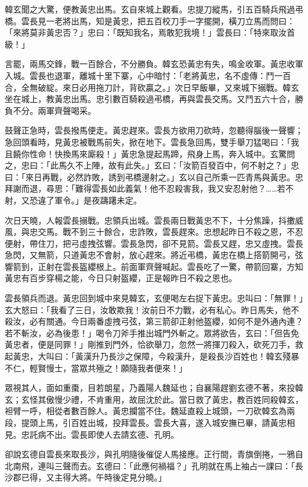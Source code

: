 韓玄聞之大驚，便教黃忠出馬。玄自來城上觀看。忠提刀縱馬，引五百騎兵飛過弔橋。雲長見一老將出馬，知是黃忠，把五百校刀手一字擺開，橫刀立馬而問曰：「來將莫非黃忠否？」忠曰：「既知我名，焉敢犯我境！」雲長曰：「特來取汝首級！」

言罷，兩馬交鋒，戰一百餘合，不分勝負。韓玄恐黃忠有失，鳴金收軍。黃忠收軍入城。雲長也退軍，離城十里下寨，心中暗忖：「老將黃忠，名不虛傳：鬥一百合，全無破綻。來日必用拖刀計，背砍贏之。」次日早飯畢，又來城下搦戰。韓玄坐在城上，教黃忠出馬。忠引數百騎殺過弔橋，再與雲長交馬。又鬥五六十合，勝負不分。兩軍齊聲喝采。

鼓聲正急時，雲長撥馬便走。黃忠趕來。雲長方欲用刀砍時，忽聽得腦後一聲響；急回頭看時，見黃忠被戰馬前失，掀在地下。雲長急回馬，雙手舉刀猛喝曰：「我且饒你性命！快換馬來廝殺！」黃忠急提起馬蹄，飛身上馬，奔入城中。玄驚問之，忠曰：「此馬久不上陣，故有此失。」玄曰：「汝箭百發百中，何不射之？」忠曰：「來日再戰，必然詐敗，誘到弔橋邊射之。」玄以自己所乘一匹青馬與黃忠。忠拜謝而退，尋思：「難得雲長如此義氣！他不忍殺害我，我又安忍射他？……若不射，又恐違了軍令。」是夜躊躇未定。

次日天曉，人報雲長搦戰。忠領兵出城。雲長兩日戰黃忠不下，十分焦躁，抖擻威風，與忠交馬。戰不到三十餘合，忠詐敗，雲長趕來。忠想起昨日不殺之恩，不忍便射，帶住刀，把弓虛拽弦響。雲長急閃，卻不見箭。雲長又趕，忠又虛拽。雲長急閃，又無箭，只道黃忠不會射，放心趕來。將近弔橋，黃忠在橋上搭箭開弓，弦響箭到，正射在雲長盔纓根上。前面軍齊聲喊起。雲長吃了一驚，帶箭回寨，方知黃忠有百步穿楊之能，今日只射盔纓，正是報昨日不殺之恩也。

雲長領兵而退。黃忠回到城中來見韓玄，玄便喝左右捉下黃忠。忠叫曰：「無罪！」玄大怒曰：「我看了三日，汝敢欺我！汝前日不力戰，必有私心。昨日馬失，他不殺汝，必有關通。今日兩番虛拽弓弦，第三箭卻正射他盔纓，如何不是外通內連？若不斬汝，必為後患！」喝令刀斧手推出城門外斬之。眾將欲告，玄曰：「但告免黃忠者，便是同罪！」剛推到門外，恰欲舉刀，忽然一將揮刀殺入，砍死刀手，救起黃忠，大叫曰：「黃漢升乃長沙之保障，今殺漢升，是殺長沙百姓也！韓玄殘暴不仁，輕賢慢士，當眾共殛之！願隨我者便來！」

眾視其人，面如重棗，目若朗星，乃義陽人魏延也；自襄陽趕劉玄德不著，來投韓玄；玄怪其傲慢少禮，不肯重用，故屈沈於此。當日救了黃忠，教百姓同殺韓玄，袒臂一呼，相從者數百餘人。黃忠攔當不住。魏延直殺上城頭，一刀砍韓玄為兩段，提頭上馬，引百姓出城，投拜雲長。雲長大喜，遂入城安撫已畢，請黃忠相見。忠託病不出。雲長即使人去請玄德、孔明。

卻說玄德自雲長來取長沙，與孔明隨後催促人馬接應。正行間，青旗倒捲，一鴉自北南飛，連叫三聲而去。玄德曰：「此應何禍福？」孔明就在馬上袖占一課曰：「長沙郡已得，又主得大將。午時後定見分曉。」

